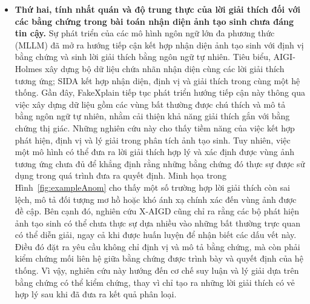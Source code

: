 \documentclass[12pt]{report}
\begin{document}
\begin{itemize}
    \item \textbf{Thứ hai, tính nhất quán và độ trung thực của lời giải thích đối với các bằng chứng trong bài toán nhận diện ảnh tạo sinh chưa đáng tin cậy.} Sự phát triển của các mô hình ngôn ngữ lớn đa phương thức (MLLM) đã mở ra hướng tiếp cận kết hợp nhận diện ảnh tạo sinh với định vị bằng chứng và sinh lời giải thích bằng ngôn ngữ tự nhiên. Tiêu biểu, AIGI-Holmes \cite{zhou2025aigi} xây dựng bộ dữ liệu chứa nhãn nhận diện cùng các lời giải thích tương ứng; SIDA \cite{huang2025sida} kết hợp nhận diện, định vị và giải thích trong cùng một hệ thống. Gần đây, FakeXplain \cite{ji2026fakexplain} tiếp tục phát triển hướng tiếp cận này thông qua việc xây dựng dữ liệu gồm các vùng bất thường được chú thích và mô tả bằng ngôn ngữ tự nhiên, nhằm cải thiện khả năng giải thích gắn với bằng chứng thị giác. Những nghiên cứu này cho thấy tiềm năng của việc kết hợp phát hiện, định vị và lý giải trong phân tích ảnh tạo sinh. Tuy nhiên, việc một mô hình có thể đưa ra lời giải thích hợp lý và xác định được vùng ảnh tương ứng chưa đủ để khẳng định rằng những bằng chứng đó thực sự được sử dụng trong quá trình đưa ra quyết định. Minh họa trong Hình~\ref{fig:exampleAnom} cho thấy một số trường hợp lời giải thích còn sai lệch, mô tả đối tượng mơ hồ hoặc khó ánh xạ chính xác đến vùng ảnh được đề cập. Bên cạnh đó, nghiên cứu X-AIGD \cite{xiao2026xaigd} cũng chỉ ra rằng các bộ phát hiện ảnh tạo sinh có thể chưa thực sự dựa nhiều vào những bất thường trực quan có thể diễn giải, ngay cả khi được huấn luyện để nhận biết các dấu vết này. Điều đó đặt ra yêu cầu không chỉ định vị và mô tả bằng chứng, mà còn phải kiểm chứng mối liên hệ giữa bằng chứng được trình bày và quyết định của hệ thống. Vì vậy, nghiên cứu này hướng đến cơ chế suy luận và lý giải dựa trên bằng chứng có thể kiểm chứng, thay vì chỉ tạo ra những lời giải thích có vẻ hợp lý sau khi đã đưa ra kết quả phân loại.
    

\end{itemize}
\end{document}
